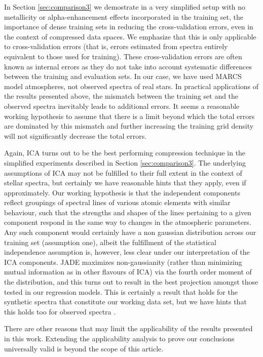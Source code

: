 \documentclass[a4paper,fleqn,usenatbib]{mnras}
\begin{document}
{In Section \ref{sec:comparison3} we demostrate in a very simplified setup with 
no metallicity or alpha-enhancement effects incorporated in the training set,
the importance of dense training sets in reducing the cross-validation errors, 
even in the context of compressed data spaces. We emphasize that this is only 
applicable to cross-validation errors (that is, errors estimated from spectra 
entirely equivalent to those used for training). These cross-validation errors 
are often known as internal errors as they do not take into account systematic 
differences between the training and evaluation sets. In our case, we have used 
MARCS model atmospheres, not observed spectra of real stars. In practical 
applications of the results presented above, the mismatch between the training 
set and the observed spectra inevitably leads to additional errors.
It seems a reasonable working hypothesis to assume that there is a limit beyond 
which the total errors are dominated by this mismatch and further increasing the 
training grid density will not significantly decrease the total errors.  

Again, ICA turns out to be the best performing compression technique in the 
simplified experiments described in Section \ref{sec:comparison3}. The 
underlying assumptions of ICA may not be 
fulfilled to their full extent in the context of stellar 
spectra, but certainly we have reasonable hints that they 
apply, even if approximately. Our 
working hypothesis is that the independent components reflect 
groupings of spectral lines of various atomic elements with 
similar behaviour, such that the strengths and shapes of the 
lines pertaining to a given component respond in the same way 
to changes in the atmospheric parameters. Any such component 
would certainly have a non gaussian distribution across our 
training set (assumption one), albeit the fulfillment of the 
statistical independence assumption is, however, less clear 
under our interpretation of the ICA components. JADE maximizes 
non-gaussianity (rather than minimizing mutual information as 
in other flavours of ICA) via the fourth order moment of the 
distribution, and this turns out to result in the best projection 
amongst those tested in our regression models. This is certainly 
a result that holds for the synthetic spectra that constitute 
our working data set, but we have hints that this holds too for 
observed spectra \citep{2013A&A...550A.120S}.
 
There are other reasons that may limit the applicability of the results 
presented in this work. Extending the applicability analysis to prove our 
conclusions universally valid is beyond the scope of this article.

}
\end{document}
